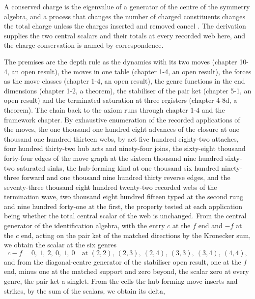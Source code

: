 \begin{chbridge}
A conserved charge is the eigenvalue of a generator of the centre of the symmetry algebra, and a process that changes the number of charged constituents changes the total charge unless the charges inserted and removed cancel \cite{Noether1918,Nishijima1955}. The derivation supplies the two central scalars and their totals at every recorded web here, and the charge conservation is named by correspondence.
\end{chbridge}
\begin{chproof}
The premises are the depth rule as the dynamics with its two moves (chapter 10-4, an open result), the moves in one table (chapter 1-4, an open result), the forces as the move classes (chapter 1-4, an open result), the genre functions in the end dimensions (chapter 1-2, a theorem), the stabiliser of the pair ket (chapter 5-1, an open result) and the terminated saturation at three registers (chapter 4-8d, a theorem). The chain back to the axiom runs through chapter 1-4 and the framework chapter. By exhaustive enumeration of the recorded applications of the moves, the one thousand one hundred eight advances of the closure at one thousand one hundred thirteen webs, by act five hundred eighty-two attaches, four hundred thirty-two hub acts and ninety-four joins, the sixty-eight thousand forty-four edges of the move graph at the sixteen thousand nine hundred sixty-two saturated sinks, the hub-forming kind at one thousand six hundred ninety-three forward and one thousand nine hundred thirty reverse edges, and the seventy-three thousand eight hundred twenty-two recorded webs of the termination wave, two thousand eight hundred fifteen typed at the second rung and nine hundred forty-one at the first, the property tested at each application being whether the total central scalar of the web is unchanged. From the central generator of the identification algebra, with the entry $c$ at the $f$ end and $-f$ at the $c$ end, acting on the pair ket of the matched directions by the Kronecker sum, we obtain the scalar at the six genres
\begin{equation}
c - f = 0,\ 1,\ 2,\ 0,\ 1,\ 0 \quad\text{at } (2,2),\ (2,3),\ (2,4),\ (3,3),\ (3,4),\ (4,4) ,
\end{equation}
and from the diagonal-centre generator of the stabiliser open result, one at the $f$ end, minus one at the matched support and zero beyond, the scalar zero at every genre, the pair ket a singlet. From the cells the hub-forming move inserts and strikes, by the sum of the scalars, we obtain its delta,

\end{chproof}
